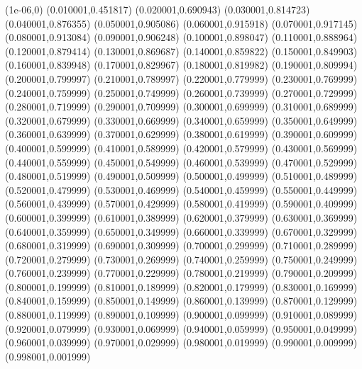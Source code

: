 \expandafter\def\csname heapTam@W_4\endcsname{(1e-06,0) (0.010001,0.451817) (0.020001,0.690943) (0.030001,0.814723) (0.040001,0.876355) (0.050001,0.905086) (0.060001,0.915918) (0.070001,0.917145) (0.080001,0.913084) (0.090001,0.906248) (0.100001,0.898047) (0.110001,0.888964) (0.120001,0.879414) (0.130001,0.869687) (0.140001,0.859822) (0.150001,0.849903) (0.160001,0.839948) (0.170001,0.829967) (0.180001,0.819982) (0.190001,0.809994) (0.200001,0.799997) (0.210001,0.789997) (0.220001,0.779999) (0.230001,0.769999) (0.240001,0.759999) (0.250001,0.749999) (0.260001,0.739999) (0.270001,0.729999) (0.280001,0.719999) (0.290001,0.709999) (0.300001,0.699999) (0.310001,0.689999) (0.320001,0.679999) (0.330001,0.669999) (0.340001,0.659999) (0.350001,0.649999) (0.360001,0.639999) (0.370001,0.629999) (0.380001,0.619999) (0.390001,0.609999) (0.400001,0.599999) (0.410001,0.589999) (0.420001,0.579999) (0.430001,0.569999) (0.440001,0.559999) (0.450001,0.549999) (0.460001,0.539999) (0.470001,0.529999) (0.480001,0.519999) (0.490001,0.509999) (0.500001,0.499999) (0.510001,0.489999) (0.520001,0.479999) (0.530001,0.469999) (0.540001,0.459999) (0.550001,0.449999) (0.560001,0.439999) (0.570001,0.429999) (0.580001,0.419999) (0.590001,0.409999) (0.600001,0.399999) (0.610001,0.389999) (0.620001,0.379999) (0.630001,0.369999) (0.640001,0.359999) (0.650001,0.349999) (0.660001,0.339999) (0.670001,0.329999) (0.680001,0.319999) (0.690001,0.309999) (0.700001,0.299999) (0.710001,0.289999) (0.720001,0.279999) (0.730001,0.269999) (0.740001,0.259999) (0.750001,0.249999) (0.760001,0.239999) (0.770001,0.229999) (0.780001,0.219999) (0.790001,0.209999) (0.800001,0.199999) (0.810001,0.189999) (0.820001,0.179999) (0.830001,0.169999) (0.840001,0.159999) (0.850001,0.149999) (0.860001,0.139999) (0.870001,0.129999) (0.880001,0.119999) (0.890001,0.109999) (0.900001,0.099999) (0.910001,0.089999) (0.920001,0.079999) (0.930001,0.069999) (0.940001,0.059999) (0.950001,0.049999) (0.960001,0.039999) (0.970001,0.029999) (0.980001,0.019999) (0.990001,0.009999) (0.998001,0.001999)}
